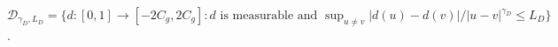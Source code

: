 \(\mathcal D_{\gamma_D,L_D}=\{d:[0,1]\to[-2C_g,2C_g]:d\text{ is measurable and }\sup_{u\ne v}|d(u)-d(v)|/|u-v|^{\gamma_D}\le L_D\}\).